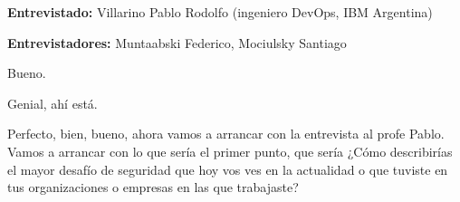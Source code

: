 
\textbf{Entrevistado:} Villarino Pablo Rodolfo (ingeniero DevOps, IBM Argentina)

\textbf{Entrevistadores:} Muntaabski Federico, Mociulsky Santiago

\begin{description}[leftmargin=0cm, labelsep=0.5cm]
    \item[\textbf{MUNTAABSKI FEDERICO:}] Bueno.

    \item[\textbf{MOCIULSKY SANTIAGO:}] Genial, ahí está.

    \item[\textbf{MUNTAABSKI FEDERICO:}] Perfecto, bien, bueno, ahora vamos a arrancar con la entrevista al profe Pablo. Vamos a arrancar con lo que sería el primer punto, que sería ¿Cómo describirías el mayor desafío de seguridad que hoy vos ves en la actualidad o que tuviste en tus organizaciones o empresas en las que trabajaste?


\end{description}
